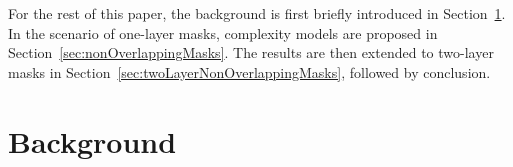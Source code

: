 \documentclass{sig-alternate}
\begin{document}

For the rest of this paper, the background is first briefly introduced in Section~\ref{sec:relatedWorks}.
In the scenario of one-layer masks, complexity models are proposed in Section~\ref{sec:nonOverlappingMasks}.
The results are then extended to two-layer masks in Section~\ref{sec:twoLayerNonOverlappingMasks},
followed by conclusion.

\section{Background}
\label{sec:relatedWorks}
\end{document}
